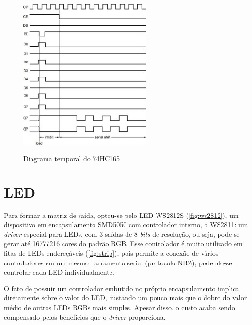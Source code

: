 \begin{figure}[!htb]
    \centering
    \caption{Diagrama temporal do 74HC165}
    \includegraphics[width=0.6\textwidth]{./dados/figuras/shift-temporal}
    \label{fig:shift-temporal}
\end{figure}


\section{LED}
\label{sec:led}

Para formar a matriz de saída, optou-se pelo LED WS2812S (\autoref{fig:ws2812}), um dispositivo em encapsulamento SMD5050 com controlador interno, o WS2811: um \emph{driver} especial para LEDs, com 3 saídas de 8 \emph{bits} de resolução, ou seja, pode-se gerar até 16777216 cores do padrão RGB. Esse controlador é muito utilizado em fitas de LEDs endereçáveis (\autoref{fig:strip}), pois permite a conexão de vários controladores em um mesmo barramento serial (protocolo NRZ), podendo-se controlar cada LED individualmente.

O fato de possuir um controlador embutido no próprio encapsulamento implica diretamente sobre o valor do LED, custando um pouco mais que o dobro do valor médio de outros LEDs RGBs mais simples. Apesar disso, o custo acaba sendo compensado pelos benefícios que o \emph{driver} proporciona.

